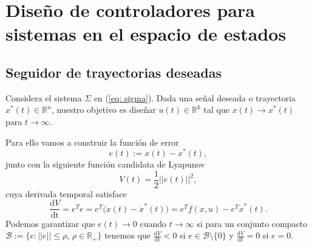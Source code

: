 \chapter{Diseño de controladores para sistemas en el espacio de estados}

\section{Seguidor de trayectorias deseadas}
Considera el sistema $\Sigma$ en (\ref{eq: sigma}). Dada una señal deseada o trayectoria $x^*(t)\in\mathbb{R}^n$, nuestro objetivo es diseñar $u(t)\in\mathbb{R}^k$ tal que $x(t) \to x^*(t)$ para $t\to\infty$.

Para ello vamos a construir la función de error
\begin{equation}
	e(t) := x(t) - x^*(t),
\end{equation}
junto con la siguiente función candidata de Lyapunov
\begin{equation}
	V(t) = \frac{1}{2}||e(t)||^2,
	\label{eq: lyaE}
\end{equation}
cuya derivada temporal satisface
\begin{equation}
	\frac{\mathrm{d}V}{\mathrm{dt}} = e^T\dot e = e^T\big(\dot x(t) - \dot x^*(t)\big) = e^Tf(x,u) - e^T \dot x^*(t).
\end{equation}
Podemos garantizar que $e(t)\to 0$ cuando $t\to\infty$ si para un conjunto compacto $\mathcal{B} := \{e : ||e|| \leq \rho, \, \rho\in\mathbb{R}_+ \}$ tenemos que $\frac{\mathrm{d}V}{\mathrm{dt}} < 0$ si $e\in\mathcal{B} \setminus \{0\}$ y $\frac{\mathrm{d}V}{\mathrm{dt}} = 0$ si $e = 0$.

